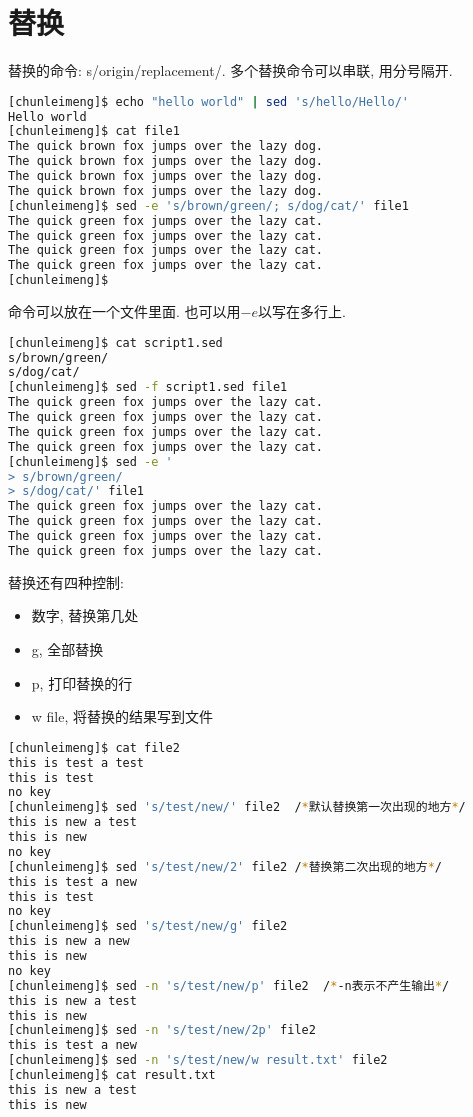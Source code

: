 \documentclass{article}
\begin{document}
\section{替换}
替换的命令: s/origin/replacement/. 多个替换命令可以串联, 用分号隔开. \par
\begin{lstlisting}[language=bash, caption={Substitution}]
[chunleimeng]$ echo "hello world" | sed 's/hello/Hello/'
Hello world
[chunleimeng]$ cat file1 
The quick brown fox jumps over the lazy dog.
The quick brown fox jumps over the lazy dog.
The quick brown fox jumps over the lazy dog.
The quick brown fox jumps over the lazy dog.
[chunleimeng]$ sed -e 's/brown/green/; s/dog/cat/' file1 
The quick green fox jumps over the lazy cat.
The quick green fox jumps over the lazy cat.
The quick green fox jumps over the lazy cat.
The quick green fox jumps over the lazy cat.
[chunleimeng]$
\end{lstlisting}
命令可以放在一个文件里面. 也可以用$-e$以写在多行上.
\begin{lstlisting}[language=bash, caption={Substitution}]
[chunleimeng]$ cat script1.sed 
s/brown/green/
s/dog/cat/
[chunleimeng]$ sed -f script1.sed file1 
The quick green fox jumps over the lazy cat.
The quick green fox jumps over the lazy cat.
The quick green fox jumps over the lazy cat.
The quick green fox jumps over the lazy cat.
[chunleimeng]$ sed -e '
> s/brown/green/
> s/dog/cat/' file1
The quick green fox jumps over the lazy cat.
The quick green fox jumps over the lazy cat.
The quick green fox jumps over the lazy cat.
The quick green fox jumps over the lazy cat.
\end{lstlisting}
替换还有四种控制:
\begin{itemize}
	\item 数字, 替换第几处
	\item g, 全部替换
	\item p, 打印替换的行
	\item w file, 将替换的结果写到文件
\end{itemize}
\begin{lstlisting}[language=bash, caption={Substitution}]
[chunleimeng]$ cat file2
this is test a test
this is test
no key
[chunleimeng]$ sed 's/test/new/' file2  /*默认替换第一次出现的地方*/
this is new a test
this is new
no key
[chunleimeng]$ sed 's/test/new/2' file2 /*替换第二次出现的地方*/
this is test a new
this is test
no key
[chunleimeng]$ sed 's/test/new/g' file2
this is new a new
this is new
no key
[chunleimeng]$ sed -n 's/test/new/p' file2  /*-n表示不产生输出*/
this is new a test
this is new
[chunleimeng]$ sed -n 's/test/new/2p' file2
this is test a new
[chunleimeng]$ sed -n 's/test/new/w result.txt' file2
[chunleimeng]$ cat result.txt 
this is new a test
this is new
\end{lstlisting}
\end{document}

